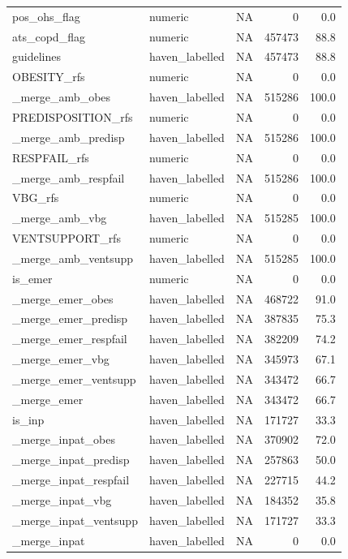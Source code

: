 \documentclass[
  11pt,
  letterpaper,
  DIV=11,
  numbers=noendperiod]{scrartcl}
\begin{document}
\begin{longtable*}{llrrr}
pos\_ohs\_flag & numeric & NA & 0 & 0.0\\
\addlinespace
ats\_copd\_flag & numeric & NA & 457473 & 88.8\\
guidelines & haven\_labelled & NA & 457473 & 88.8\\
OBESITY\_rfs & numeric & NA & 0 & 0.0\\
\_merge\_amb\_obes & haven\_labelled & NA & 515286 & 100.0\\
PREDISPOSITION\_rfs & numeric & NA & 0 & 0.0\\
\addlinespace
\_merge\_amb\_predisp & haven\_labelled & NA & 515286 & 100.0\\
RESPFAIL\_rfs & numeric & NA & 0 & 0.0\\
\_merge\_amb\_respfail & haven\_labelled & NA & 515286 & 100.0\\
VBG\_rfs & numeric & NA & 0 & 0.0\\
\_merge\_amb\_vbg & haven\_labelled & NA & 515285 & 100.0\\
\addlinespace
VENTSUPPORT\_rfs & numeric & NA & 0 & 0.0\\
\_merge\_amb\_ventsupp & haven\_labelled & NA & 515285 & 100.0\\
is\_emer & numeric & NA & 0 & 0.0\\
\_merge\_emer\_obes & haven\_labelled & NA & 468722 & 91.0\\
\_merge\_emer\_predisp & haven\_labelled & NA & 387835 & 75.3\\
\addlinespace
\_merge\_emer\_respfail & haven\_labelled & NA & 382209 & 74.2\\
\_merge\_emer\_vbg & haven\_labelled & NA & 345973 & 67.1\\
\_merge\_emer\_ventsupp & haven\_labelled & NA & 343472 & 66.7\\
\_merge\_emer & haven\_labelled & NA & 343472 & 66.7\\
is\_inp & haven\_labelled & NA & 171727 & 33.3\\
\addlinespace
\_merge\_inpat\_obes & haven\_labelled & NA & 370902 & 72.0\\
\_merge\_inpat\_predisp & haven\_labelled & NA & 257863 & 50.0\\
\_merge\_inpat\_respfail & haven\_labelled & NA & 227715 & 44.2\\
\_merge\_inpat\_vbg & haven\_labelled & NA & 184352 & 35.8\\
\_merge\_inpat\_ventsupp & haven\_labelled & NA & 171727 & 33.3\\
\addlinespace
\_merge\_inpat & haven\_labelled & NA & 0 & 0.0\\

\end{longtable*}
\end{document}

